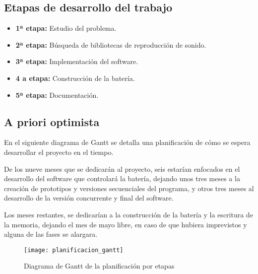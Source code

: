         \subsection{Etapas de desarrollo del trabajo} %
        \label{sub:EtapasDeDesarrolloDelTrabajo}

            \begin{itemize}
                \item \textbf{1ª etapa:} Estudio del problema.

                \item \textbf{2ª etapa:} Búsqueda de bibliotecas de reproducción de sonido.

                \item \textbf{3ª etapa:} Implementación del software.

                \item \textbf{4 a etapa:} Construcción de la batería.

                \item \textbf{5ª etapa:} Documentación.
            \end{itemize}


        \subsection{A priori optimista} %
        \label{sub:APrioriOptimista}

            En el siguiente diagrama de Gantt se detalla una planificación de cómo se espera desarrollar el proyecto en
            el tiempo.

            De los nueve meses que se dedicarán al proyecto, seis estarían enfocados en el desarrollo del
            software que controlará la batería, dejando unos tres meses a la creación de prototipos y versiones
            secuenciales del programa, y otros tres meses al desarrollo de la versión concurrente y final del software.

            Los meses restantes, se dedicarían a la construcción de la batería y la escritura de la memoria, dejando el
            mes de mayo libre, en caso de que hubiera imprevistos y alguna de las fases se alargara.

            \begin{figure}[ht]
                \centering
                \texttt{[image: planificacion\_gantt]}
                \caption{Diagrama de Gantt de la planificación por etapas\label{fig:PlanificacionGantt}}
            \end{figure}

